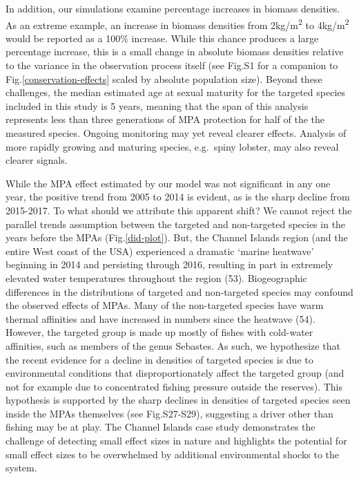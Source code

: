 \documentclass[9pt,twocolumn,twoside,lineno]{pnas-new}
\begin{document}
In addition, our simulations examine percentage increases in biomass
densities. As an extreme example, an increase in biomass densities from
2kg/m\textsuperscript{2} to 4kg/m\textsuperscript{2} would be reported
as a 100\% increase. While this chance produces a large percentage
increase, this is a small change in absolute biomass densities relative
to the variance in the observation process itself (see Fig.S1 for a
companion to Fig.\ref{conservation-effects} scaled by absolute
population size). Beyond these challenges, the median estimated age at
sexual maturity for the targeted species included in this study is 5
years, meaning that the span of this analysis represents less than three
generations of MPA protection for half of the the measured species.
Ongoing monitoring may yet reveal clearer effects. Analysis of more
rapidly growing and maturing species, e.g.~spiny lobster, may also
reveal clearer signals.

While the MPA effect estimated by our model was not significant in any
one year, the positive trend from 2005 to 2014 is evident, as is the
sharp decline from 2015-2017. To what should we attribute this apparent
shift? We cannot reject the parallel trends assumption between the
targeted and non-targeted species in the years before the MPAs
(Fig.\ref{did-plot}). But, the Channel Islands region (and the entire
West coast of the USA) experienced a dramatic `marine heatwave'
beginning in 2014 and persisting through 2016, resulting in part in
extremely elevated water temperatures throughout the region (53).
Biogeographic differences in the distributions of targeted and
non-targeted species may confound the observed effects of MPAs. Many of
the non-targeted species have warm thermal affinities and have increased
in numbers since the heatwave (54). However, the targeted group is made
up mostly of fishes with cold-water affinities, such as members of the
genus Sebastes. As such, we hypothesize that the recent evidence for a
decline in densities of targeted species is due to environmental
conditions that disproportionately affect the targeted group (and not
for example due to concentrated fishing pressure outside the reserves).
This hypothesis is supported by the sharp declines in densities of
targeted species seen inside the MPAs themselves (see Fig.S27-S29),
suggesting a driver other than fishing may be at play. The Channel
Islands case study demonstrates the challenge of detecting small effect
sizes in nature and highlights the potential for small effect sizes to
be overwhelmed by additional environmental shocks to the system.
\end{document}
